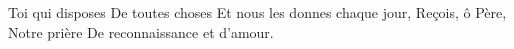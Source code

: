 \beginverse*
Toi qui disposes
De toutes choses
Et nous les donnes chaque jour,
Reçois, ô Père,
Notre prière
De reconnaissance et d'amour.
\endverse
\endsong
